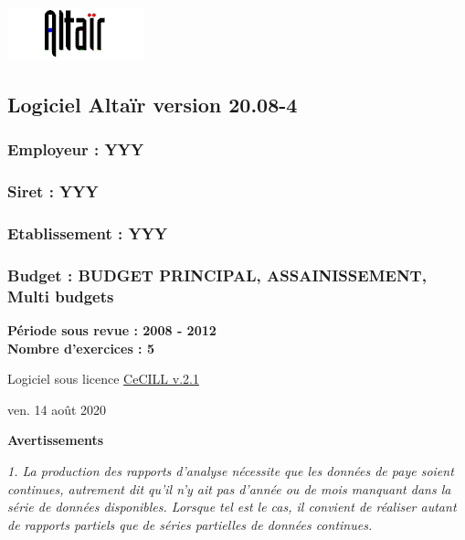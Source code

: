 \includegraphics{icones/altair.png}

\hypertarget{logiciel-altair-version-20.08-4}{%
\subsection{Logiciel Altaïr version
20.08-4}\label{logiciel-altair-version-20.08-4}}

\hypertarget{employeur-yyy}{%
\subsubsection{Employeur : YYY}\label{employeur-yyy}}

\hypertarget{siret-yyy}{%
\subsubsection{Siret : YYY}\label{siret-yyy}}

\hypertarget{etablissement-yyy}{%
\subsubsection{Etablissement : YYY}\label{etablissement-yyy}}

\hypertarget{budget-budget-principal-assainissement-multi-budgets}{%
\subsubsection{Budget : BUDGET PRINCIPAL, ASSAINISSEMENT, Multi
budgets}\label{budget-budget-principal-assainissement-multi-budgets}}

\textbf{Période sous revue : 2008 - 2012 }\\
\textbf{Nombre d'exercices : 5 }

Logiciel sous licence \href{../Docs/LICENCE.html}{CeCILL v.2.1}

ven. 14 août 2020

\textbf{Avertissements}

\emph{1. La production des rapports d'analyse nécessite que les données
de paye soient continues, autrement dit qu'il n'y ait pas d'année ou de
mois manquant dans la série de données disponibles. Lorsque tel est le
cas, il convient de réaliser autant de rapports partiels que de séries
partielles de données continues.}

